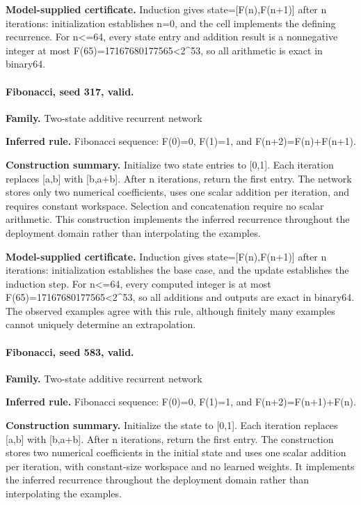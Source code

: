 \textbf{Model-supplied certificate.} Induction gives state=[F(n),F(n+1)] after n iterations: initialization establishes n=0, and the cell implements the defining recurrence. For n<=64, every state entry and addition result is a nonnegative integer at most F(65)=17167680177565<2\textasciicircum{}53, so all arithmetic is exact in binary64.


\paragraph{Fibonacci, seed 317, valid.}

\textbf{Family.} Two-state additive recurrent network


\textbf{Inferred rule.} Fibonacci sequence: F(0)=0, F(1)=1, and F(n+2)=F(n)+F(n+1).


\textbf{Construction summary.} Initialize two state entries to [0,1]. Each iteration replaces [a,b] with [b,a+b]. After n iterations, return the first entry. The network stores only two numerical coefficients, uses one scalar addition per iteration, and requires constant workspace. Selection and concatenation require no scalar arithmetic. This construction implements the inferred recurrence throughout the deployment domain rather than interpolating the examples.


\textbf{Model-supplied certificate.} Induction gives state=[F(n),F(n+1)] after n iterations: initialization establishes the base case, and the update establishes the induction step. For n<=64, every computed integer is at most F(65)=17167680177565<2\textasciicircum{}53, so all additions and outputs are exact in binary64. The observed examples agree with this rule, although finitely many examples cannot uniquely determine an extrapolation.


\paragraph{Fibonacci, seed 583, valid.}

\textbf{Family.} Two-state additive recurrent network


\textbf{Inferred rule.} Fibonacci sequence: F(0)=0, F(1)=1, and F(n+2)=F(n+1)+F(n).


\textbf{Construction summary.} Initialize the state to [0,1]. Each iteration replaces [a,b] with [b,a+b]. After n iterations, return the first entry. The construction stores two numerical coefficients in the initial state and uses one scalar addition per iteration, with constant-size workspace and no learned weights. It implements the inferred recurrence throughout the deployment domain rather than interpolating the examples.


